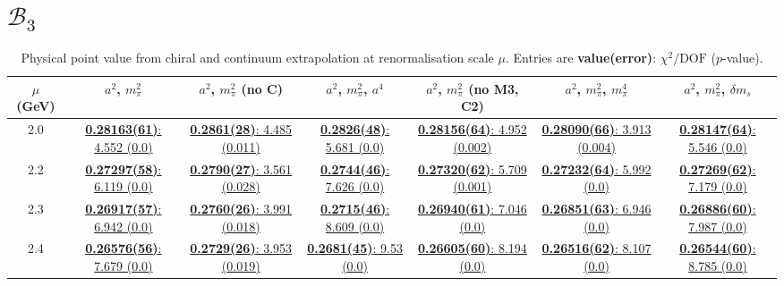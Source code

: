 \documentclass[12pt]{extarticle}
\begin{document}
\section{$\mathcal{B}_3$}
\begin{table}[h!]
\begin{center}
\begin{tabular}{|c|c|c|c|c|c|c|}
\hline
$\mu$ (GeV) & $a^2$, $m_\pi^2$& $a^2$, $m_\pi^2$ (no C)& $a^2$, $m_\pi^2$, $a^4$& $a^2$, $m_\pi^2$ (no M3, C2)& $a^2$, $m_\pi^2$, $m_\pi^4$& $a^2$, $m_\pi^2$, $\delta m_s$\\
\hline
2.0& \hyperlink{SSmPP/SUSY/bag_a2m2_20.pdf.1}{\textbf{0.28163(61)}: 4.552 (0.0)} & \hyperlink{SSmPP/SUSY/bag_a2m2noC_20.pdf.1}{\textbf{0.2861(28)}: 4.485 (0.011)} & \hyperlink{SSmPP/SUSY/bag_a2a4m2_20.pdf.1}{\textbf{0.2826(48)}: 5.681 (0.0)} & \hyperlink{SSmPP/SUSY/bag_a2m2mcut_20.pdf.1}{\textbf{0.28156(64)}: 4.952 (0.002)} & \hyperlink{SSmPP/SUSY/bag_a2m2m4_20.pdf.1}{\textbf{0.28090(66)}: 3.913 (0.004)} & \hyperlink{SSmPP/SUSY/bag_a2m2delm_20.pdf.1}{\textbf{0.28147(64)}: 5.546 (0.0)}\\
2.2& \hyperlink{SSmPP/SUSY/bag_a2m2_22.pdf.1}{\textbf{0.27297(58)}: 6.119 (0.0)} & \hyperlink{SSmPP/SUSY/bag_a2m2noC_22.pdf.1}{\textbf{0.2790(27)}: 3.561 (0.028)} & \hyperlink{SSmPP/SUSY/bag_a2a4m2_22.pdf.1}{\textbf{0.2744(46)}: 7.626 (0.0)} & \hyperlink{SSmPP/SUSY/bag_a2m2mcut_22.pdf.1}{\textbf{0.27320(62)}: 5.709 (0.001)} & \hyperlink{SSmPP/SUSY/bag_a2m2m4_22.pdf.1}{\textbf{0.27232(64)}: 5.992 (0.0)} & \hyperlink{SSmPP/SUSY/bag_a2m2delm_22.pdf.1}{\textbf{0.27269(62)}: 7.179 (0.0)}\\
2.3& \hyperlink{SSmPP/SUSY/bag_a2m2_23.pdf.1}{\textbf{0.26917(57)}: 6.942 (0.0)} & \hyperlink{SSmPP/SUSY/bag_a2m2noC_23.pdf.1}{\textbf{0.2760(26)}: 3.991 (0.018)} & \hyperlink{SSmPP/SUSY/bag_a2a4m2_23.pdf.1}{\textbf{0.2715(46)}: 8.609 (0.0)} & \hyperlink{SSmPP/SUSY/bag_a2m2mcut_23.pdf.1}{\textbf{0.26940(61)}: 7.046 (0.0)} & \hyperlink{SSmPP/SUSY/bag_a2m2m4_23.pdf.1}{\textbf{0.26851(63)}: 6.946 (0.0)} & \hyperlink{SSmPP/SUSY/bag_a2m2delm_23.pdf.1}{\textbf{0.26886(60)}: 7.987 (0.0)}\\
2.4& \hyperlink{SSmPP/SUSY/bag_a2m2_24.pdf.1}{\textbf{0.26576(56)}: 7.679 (0.0)} & \hyperlink{SSmPP/SUSY/bag_a2m2noC_24.pdf.1}{\textbf{0.2729(26)}: 3.953 (0.019)} & \hyperlink{SSmPP/SUSY/bag_a2a4m2_24.pdf.1}{\textbf{0.2681(45)}: 9.53 (0.0)} & \hyperlink{SSmPP/SUSY/bag_a2m2mcut_24.pdf.1}{\textbf{0.26605(60)}: 8.194 (0.0)} & \hyperlink{SSmPP/SUSY/bag_a2m2m4_24.pdf.1}{\textbf{0.26516(62)}: 8.107 (0.0)} & \hyperlink{SSmPP/SUSY/bag_a2m2delm_24.pdf.1}{\textbf{0.26544(60)}: 8.785 (0.0)}\\
\hline
\end{tabular}
\caption{Physical point value from chiral and continuum extrapolation at renormalisation scale $\mu$. Entries are \textbf{value(error)}: $\chi^2/\text{DOF}$ ($p$-value).}
\end{center}
\end{table}
\end{document}
